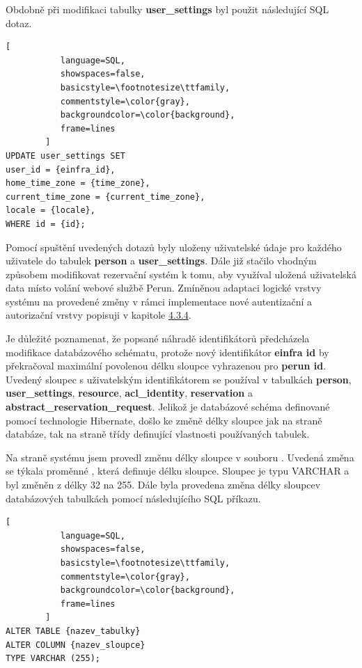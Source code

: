 \documentclass[
  printed, %
  twoside, %
  table,   %
  nolof,     %
  nolot,     %
]{fithesis3}
\begin{document}
Obdobně při modifikaci tabulky \textbf{user\_settings} byl použit následující SQL dotaz. 

\begin{lstlisting}[
           language=SQL,
           showspaces=false,
           basicstyle=\footnotesize\ttfamily,
           commentstyle=\color{gray},
           backgroundcolor=\color{background},
           frame=lines
        ]
UPDATE user_settings SET 
user_id = {einfra_id},
home_time_zone = {time_zone},
current_time_zone = {current_time_zone},
locale = {locale},
WHERE id = {id};
\end{lstlisting}

Pomocí spuštění uvedených dotazů byly uloženy uživatelské údaje pro každého uživatele do tabulek \textbf{person} a \textbf{user\_settings}. Dále již stačilo vhodným způsobem modifikovat rezervační systém  k tomu, aby využíval uložená uživatelská data místo volání webové službě Perun. Zmíněnou adaptaci logické vrstvy systému  na provedené změny v rámci implementace nové autentizační a autorizační vrstvy popisuji v kapitole \hyperref[ShongoImpl-web]{4.3.4}. 

\par

Je důležité poznamenat, že popsané náhradě identifikátorů předcházela modifikace databázového schématu, protože nový identifikátor \textbf{einfra id} by překračoval maximální povolenou délku sloupce vyhrazenou pro \textbf{perun id}. Uvedený sloupec s uživatelským identifikátorem se používal v tabulkách \textbf{person}, \textbf{user\_settings}, \textbf{resource}, \textbf{acl\_identity}, \textbf{reservation} a \textbf{abstract\_reservation\_request}. Jelikož je databázové schéma definované pomocí technologie Hibernate, došlo ke změně délky sloupce jak na straně databáze, tak na straně třídy definující vlastnosti používaných tabulek. 

\par  

Na straně systému  jsem provedl změnu délky sloupce v souboru . Uvedená změna se týkala proměnné , která definuje délku sloupce. Sloupec je typu VARCHAR a byl změněn z délky 32 na 255. Dále byla provedena změna délky sloupce\break v databázových tabulkách pomocí následujícího SQL příkazu.

\begin{lstlisting}[
           language=SQL,
           showspaces=false,
           basicstyle=\footnotesize\ttfamily,
           commentstyle=\color{gray},
           backgroundcolor=\color{background},
           frame=lines
        ]
ALTER TABLE {nazev_tabulky}  
ALTER COLUMN {nazev_sloupce}
TYPE VARCHAR (255);
\end{lstlisting}
\end{document}
